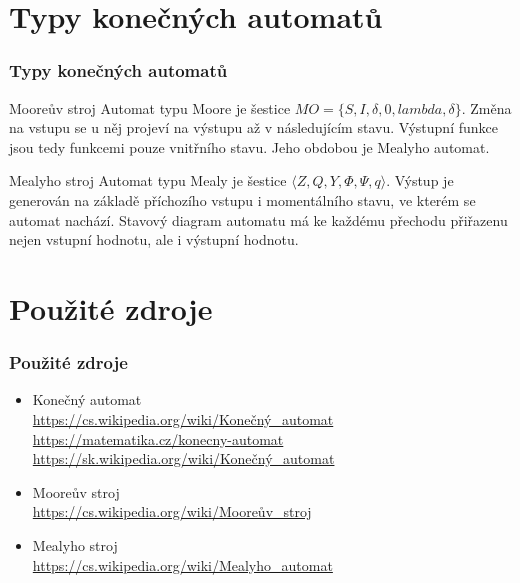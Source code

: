\documentclass[11pt,hyperref={unicode}]{beamer}
\begin{document}
	\section{Typy konečných automatů}
	\begin{frame}
		\frametitle{Typy konečných automatů}
		\begin{exampleblock}{Mooreův stroj}
			Automat typu Moore je šestice $MO=\{S,I,\delta,0,lambda,\delta\}$. Změna na vstupu se u něj projeví na výstupu až v následujícím stavu. Výstupní funkce jsou tedy funkcemi pouze vnitřního stavu. Jeho obdobou je Mealyho automat.
		\end{exampleblock}
		\begin{exampleblock}{Mealyho stroj}
			Automat typu Mealy je šestice $\langle Z, Q, Y ,\Phi ,\Psi ,q\rangle$. Výstup je generován na základě příchozího vstupu i momentálního stavu, ve kterém se automat nachází. Stavový diagram automatu má ke každému přechodu přiřazenu nejen vstupní hodnotu, ale i výstupní hodnotu.
		\end{exampleblock}
	\end{frame}

	\section{Použité zdroje}
	\begin{frame}
		\frametitle{Použité zdroje}
		\begin{itemize}
			\item Konečný automat\\[0.3em]
			\scriptsize \url{https://cs.wikipedia.org/wiki/Konečný\_automat}\\
			\url{https://matematika.cz/konecny-automat}
			\url{https://sk.wikipedia.org/wiki/Konečný\_automat}\\
			\item \normalsize Mooreův stroj\\[0.3em]
			\scriptsize \url{https://cs.wikipedia.org/wiki/Mooreův\_stroj}\\
			\item \normalsize Mealyho stroj\\[0.3em]
			\scriptsize \url{https://cs.wikipedia.org/wiki/Mealyho_automat}\\
		\end{itemize}
	\end{frame}
\end{document}
